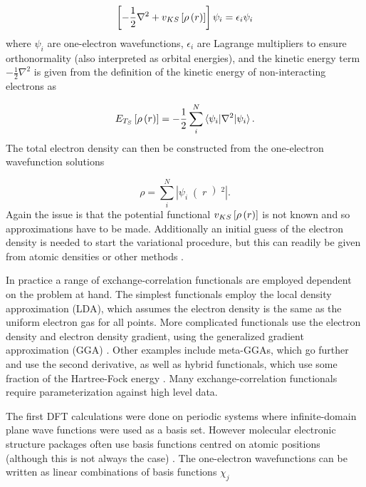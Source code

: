 \begin{equation}
    \left[ -\frac{1}{2} \nabla^2 + v_{KS} \left[ \rho\left(r\right) \right] \right] \psi_i = \epsilon_i \psi_i
\end{equation}
%
where $\psi_i$ are one-electron wavefunctions, $\epsilon_i$ are Lagrange multipliers
to ensure orthonormality (also interpreted as orbital energies), and the kinetic 
energy term $-\frac{1}{2} \nabla ^2$ is given from the definition of the kinetic 
energy of non-interacting electrons as

\begin{equation}
    E_{T_S} \left[ \rho\left(r\right) \right] = -\frac{1}{2} \sum_i^N \braket{\psi_i|\nabla^2|\psi_i}.
\end{equation}
%
The total electron density can then be constructed from the one-electron wavefunction
solutions

\begin{equation}
    \rho = \sum_i^N \left\lvert \psi_i \right( r \left)^2 \right\rvert.
\end{equation}
%
Again the issue is that the potential functional $v_{KS} \left[ \rho\left(r\right) \right]$ is
not known and so approximations have to be made. Additionally an initial guess of
the electron density is needed to start the variational procedure, but this can 
readily be given from atomic densities or other methods \cite{Lehtola2019}.

In practice a range of exchange-correlation functionals are employed dependent on
the problem at hand. The simplest functionals employ the local density approximation
(LDA), which assumes the electron density is the same as the uniform electron gas
for all points. More complicated functionals use the electron density and electron
density gradient, using the generalized gradient approximation (GGA) \cite{Langreth1983}.
Other examples include meta-GGAs, which go further and use the second derivative, 
as well as hybrid functionals, which use some fraction of the Hartree-Fock energy
\cite{Sun2011, Becke1993}. Many exchange-correlation functionals require parameterization 
against high level data.

The first DFT calculations were done on periodic systems where infinite-domain plane
wave functions were used as a basis set. However molecular electronic structure
packages often use basis functions centred on atomic positions (although this is 
not always the case) \cite{Boys1950}. The one-electron wavefunctions can be written 
as linear combinations of basis functions $\chi_j$

